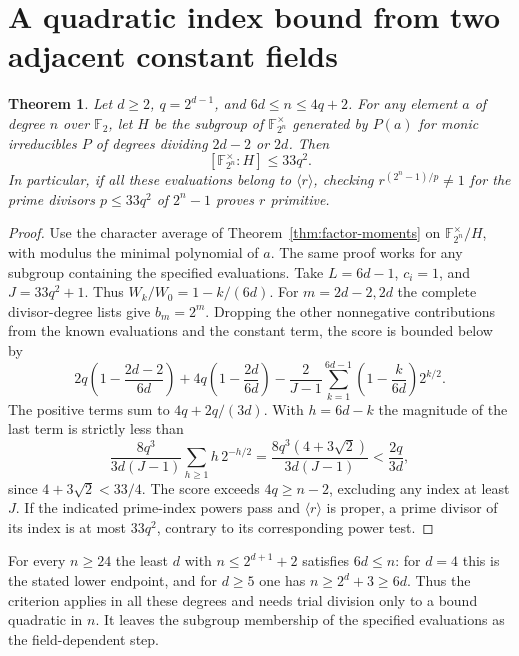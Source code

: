 \documentclass[11pt]{article}
\newtheorem{theorem}{Theorem}
\begin{document}
\section{A quadratic index bound from two adjacent constant fields}
\label{sec:two-constant-fields}
\begin{theorem}
Let \(d\ge2\), \(q=2^{d-1}\), and \(6d\le n\le4q+2\).
For any element \(a\) of degree \(n\) over \(\mathbb F_2\), let \(H\)
be the subgroup of \(\mathbb F_{2^n}^\times\) generated by \(P(a)\)
for monic irreducibles \(P\) of degrees dividing \(2d-2\) or \(2d\).
Then
\[
                   [\mathbb F_{2^n}^\times:H]\le33q^2 .
\]
In particular, if all these evaluations belong to \(\langle r\rangle\),
checking \(r^{(2^n-1)/p}\ne1\) for the prime divisors
\(p\le33q^2\) of \(2^n-1\) proves \(r\) primitive.
\end{theorem}
\begin{proof}
Use the character average of Theorem~\ref{thm:factor-moments} on
\(\mathbb F_{2^n}^\times/H\), with modulus the minimal polynomial of
\(a\). The same proof works for any subgroup containing the specified
evaluations. Take \(L=6d-1\), \(c_i=1\), and \(J=33q^2+1\).
Thus \(W_k/W_0=1-k/(6d)\).
For \(m=2d-2,2d\) the complete divisor-degree lists give
\(b_m=2^m\). Dropping the other nonnegative contributions from the
known evaluations and the constant term, the score is bounded below by
\[
 2q\left(1-\frac{2d-2}{6d}\right)
 +4q\left(1-\frac{2d}{6d}\right)
 -\frac{2}{J-1}\sum_{k=1}^{6d-1}\left(1-\frac{k}{6d}\right)2^{k/2}.
\]
The positive terms sum to \(4q+2q/(3d)\). With \(h=6d-k\) the
magnitude of the last term is strictly less than
\[
 \frac{8q^3}{3d(J-1)}\sum_{h\ge1}h\,2^{-h/2}
 =\frac{8q^3(4+3\sqrt2)}{3d(J-1)}<\frac{2q}{3d},
\]
since \(4+3\sqrt2<33/4\). The score exceeds \(4q\ge n-2\), excluding
any index at least \(J\). If the indicated prime-index powers pass
and \(\langle r\rangle\) is proper, a prime divisor of its index is
at most \(33q^2\), contrary to its corresponding power test.
\end{proof}
For every \(n\ge24\) the least \(d\) with \(n\le2^{d+1}+2\) satisfies
\(6d\le n\): for \(d=4\) this is the stated lower endpoint, and
for \(d\ge5\) one has \(n\ge2^d+3\ge6d\).
Thus the criterion applies in all these degrees and needs trial
division only to a bound quadratic in \(n\). It leaves the subgroup
membership of the specified evaluations as the field-dependent step.
\end{document}
